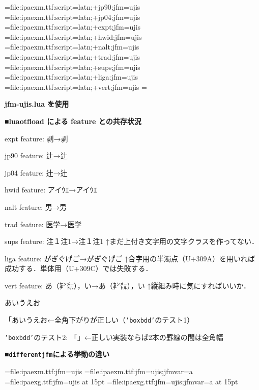 

\jfont\jisninety={file:ipaexm.ttf:script=latn;+jp90;jfm=ujis}
\jfont\jisfour={file:ipaexm.ttf:script=latn;+jp04;jfm=ujis}
\jfont\jisexpt={file:ipaexm.ttf:script=latn;+expt;jfm=ujis}
\jfont\jishwid={file:ipaexm.ttf:script=latn;+hwid;jfm=ujis}
\jfont\jisnalt={file:ipaexm.ttf:script=latn;+nalt;jfm=ujis}
\jfont\jistrad={file:ipaexm.ttf:script=latn;+trad;jfm=ujis}
\jfont\jissups={file:ipaexm.ttf:script=latn;+sups;jfm=ujis}
\jfont\jisliga={file:ipaexm.ttf:script=latn;+liga;jfm=ujis}
\jfont\jisvert={file:ipaexm.ttf:script=latn;+vert;jfm=ujis}
\parskip=\smallskipamount{}\zw

{\noindent\bf\tengt jfm-ujis.lua を使用}

\bigskip

{\noindent\bf\tengt ■luaotf\/load による feature との共存状況}

{\tentt expt} feature: 剥→{\jisexpt 剥}

{\tentt jp90} feature: 辻→{\jisninety 辻}

{\tentt jp04} feature: 辻→{\jisfour 辻}

{\tentt hwid} feature: アイｳｴ→{\jishwid アイｳｴ}\hfil\break

{\tentt nalt} feature: 男→{\jisnalt 男}

{\tentt trad} feature: 医学→{\jistrad 医学}

{\tentt sups} feature: 注１注1→{\jissups 注１注1}\hfil\break
↑まだ上付き文字用の文字クラスを作ってない．

{\tentt liga} feature: か゚き゚く゚け゚こ゚→{\jisliga か゚き゚く゚け゚こ゚}\hfil\break
↑合字用の半濁点（{\tentt U+309A}）を用いれば成功する．単体用（{\tentt U+309C}）では失敗する．%

{\tentt vert} feature: あ（㌢㍍），い→{\jisvert あ（㌢㍍），い}\hfil\break
↑縦組み時に気にすればいいか．

\bigskip

\noindent あいうえお

「あいうえお←全角下がりが正しい（{\tt'boxbdd'}のテスト1）

{\tt'boxbdd'}のテスト2: \vrule\hbox{「」}\vrule ←正しい実装ならば2本の罫線の間は全角幅


\bigskip
{\noindent\bf\tengt ■{\tt differentjfm}による挙動の違い}

\jfont\tenMa={file:ipaexm.ttf:jfm=ujis}
\jfont\tenMb={file:ipaexm.ttf:jfm=ujis;jfmvar=a}
\jfont\tenGa={file:ipaexg.ttf:jfm=ujis} at 15pt
\jfont\tenGb={file:ipaexg.ttf:jfm=ujis;jfmvar=a} at 15pt\relax


